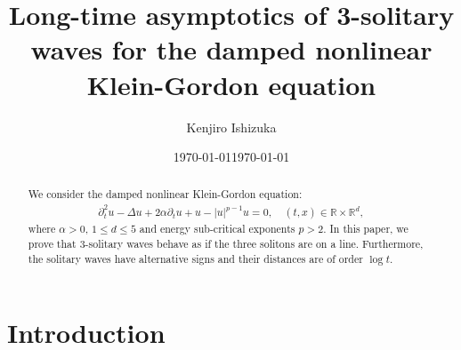 \documentclass[reqno]{amsart}
\theoremstyle{plain}
\theoremstyle{definition}
\numberwithin{equation}{section}
\newcommand{\1}{\mathbbm{1}}
\begin{document}


\title[]{Long-time asymptotics of 3-solitary waves for the damped nonlinear Klein-Gordon equation}
\author[K. Ishizuka]{Kenjiro Ishizuka}
\address[K.Ishizuka]{Research Institute for Mathematical Sciences, Kyoto University, Kyoto 606-8502, JAPAN}
\date{\today}
\date{\today}
\maketitle


\begin{abstract}
We consider the damped nonlinear Klein-Gordon equation:
\begin{align*}
\partial_{t}^2u-\Delta u+2\alpha \partial_{t}u+u-|u|^{p-1}u=0, \ & (t,x) \in \mathbb{R} \times \mathbb{R}^d,
\end{align*}
where $\alpha>0$, $1\leq d\leq 5$ and energy sub-critical exponents $p>2$. In this paper, we prove that 3-solitary waves behave as if the three solitons are on a line. Furthermore, the solitary waves have alternative signs and their distances are of order $\log{t}$.
\end{abstract}


\tableofcontents



\section{Introduction}
\end{document}
